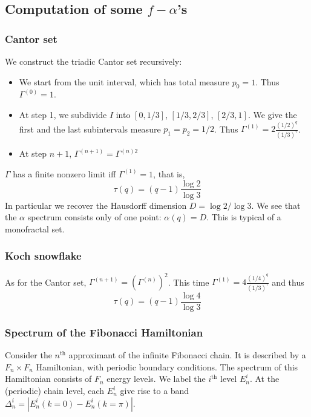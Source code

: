 \documentclass[11pt]{article}
\begin{document}
\subsection{Computation of some $f -\alpha$'s}

\subsubsection{Cantor set}
We construct the triadic Cantor set recursively:
\begin{itemize}
	\item  We start from the unit interval, which has total measure $p_0 = 1$. Thus $\Gamma^{(0)} = 1$.
	\item At step 1, we subdivide $I$ into $[0,1/3]$, $[1/3,2/3]$, $[2/3,1]$. We give the first and the last subintervals measure $p_1 = p_2 = 1/2$. Thus $\Gamma^{(1)} = 2 \frac{(1/2)^q}{(1/3)^\tau}$.
	\item At step $n+1$, $\Gamma^{(n+1)} = \Gamma^{(n)2}$
\end{itemize}
$\Gamma$ has a finite nonzero limit iff $\Gamma^{(1)} = 1$, that is,
\begin{equation}
	\tau(q) =(q-1) \frac{\log 2}{\log 3}
\end{equation}
In particular we recover the Hausdorff dimension $D = \log 2/ \log 3$. We see that the $\alpha$ spectrum consists only of one point: $\alpha(q) = D$. This is typical of a monofractal set.

\subsubsection{Koch snowflake}
As for the Cantor set, $\Gamma^{(n+1)} = \left( \Gamma^{(n)} \right)^2$. 
This time $\Gamma^{(1)} = 4 \frac{(1/4)^q}{(1/3)^\tau}$ and thus
\begin{equation}
	\tau(q) = (q-1)\frac{\log 4}{\log 3}
\end{equation}

\subsubsection{Spectrum of the Fibonacci Hamiltonian}

Consider the $n^\text{th}$ approximant of the infinite Fibonacci chain. It is described by a $F_n \times F_n$ Hamiltonian, with periodic boundary conditions. The spectrum of this Hamiltonian consists of $F_n$ energy levels. We label the $i^\text{th}$ level $E^i_n$. At the (periodic) chain level, each $E^i_n$ give rise to a band $\Delta^i_n = |E^i_n(k=0) - E^i_n(k=\pi)|$.
\end{document}
